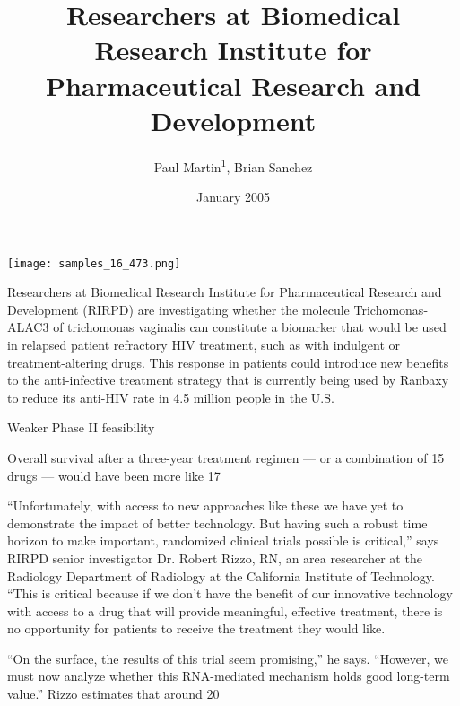 \documentclass{article}
\title{Researchers at Biomedical Research Institute for Pharmaceutical Research and Development}
\author{Paul Martin\textsuperscript{1},  Brian Sanchez}
\affil{\textsuperscript{1}Blood Transfusion Centre of Slovenia}
\date{January 2005}
\begin{document}
\maketitle

\begin{center}
\begin{minipage}{0.75\linewidth}
\texttt{[image: samples\_16\_473.png]}
\end{minipage}
\end{center}

Researchers at Biomedical Research Institute for Pharmaceutical Research and Development (RIRPD) are investigating whether the molecule Trichomonas-ALAC3 of trichomonas vaginalis can constitute a biomarker that would be used in relapsed patient refractory HIV treatment, such as with indulgent or treatment-altering drugs. This response in patients could introduce new benefits to the anti-infective treatment strategy that is currently being used by Ranbaxy to reduce its anti-HIV rate in 4.5 million people in the U.S.

Weaker Phase II feasibility

Overall survival after a three-year treatment regimen — or a combination of 15 drugs — would have been more like 17%

“Unfortunately, with access to new approaches like these we have yet to demonstrate the impact of better technology. But having such a robust time horizon to make important, randomized clinical trials possible is critical,” says RIRPD senior investigator Dr. Robert Rizzo, RN, an area researcher at the Radiology Department of Radiology at the California Institute of Technology. “This is critical because if we don’t have the benefit of our innovative technology with access to a drug that will provide meaningful, effective treatment, there is no opportunity for patients to receive the treatment they would like.

“On the surface, the results of this trial seem promising,” he says. “However, we must now analyze whether this RNA-mediated mechanism holds good long-term value.” Rizzo estimates that around 20%
\end{document}
